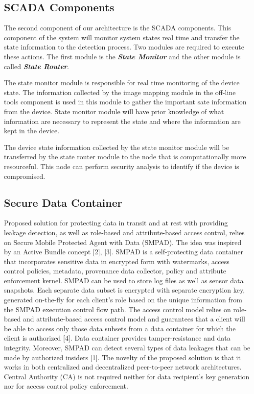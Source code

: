 \documentclass[conference]{IEEEtran}
\begin{document}
\subsection{SCADA Components}
The second component of our architecture is the SCADA components. This component of the system will monitor system states real time and transfer the state information to the detection process. Two modules are required to execute these actions. The first module is the \textit{\textbf{State Monitor}} and the other module is called \textit{\textbf{State Router}}.
\par The state monitor module is responsible for real time monitoring of the device state. The information collected by the image mapping module in the off-line tools component is used in this module to gather the important sate information from the device. State monitor module will have prior knowledge of what information are necessary to represent the state and where the information are kept in the device. 
\par The device state information collected by the state monitor module will be transferred by the state router module to the node that is computationally more resourceful. This node can perform security analysis to identify if the device is compromised.
\subsection{Secure Data Container}
Proposed solution for protecting data in transit and at rest with providing leakage detection, as well as role-based and attribute-based access control, relies on Secure Mobile Protected Agent with Data (SMPAD). The idea was inspired by an Active Bundle concept [2], [3]. SMPAD is a self-protecting data container that incorporates sensitive data in encrypted form with watermarks, access control policies, metadata, provenance data collector, policy and attribute enforcement kernel. SMPAD can be used to store log files as well as sensor data snapshots. Each separate data subset is encrypted with separate encryption key, generated on-the-fly for each client’s role based on the unique information from the SMPAD execution control flow path. The access control model relies on role-based and attribute-based access control model and guarantees that a client will be able to access only those data subsets from a data container for which the client is authorized [4]. Data container provides tamper-resistance and data integrity. Moreover, SMPAD can detect several types of data leakages that can be made by authorized insiders [1]. The novelty of the proposed solution is that it works in both centralized and decentralized peer-to-peer network architectures. Central Authority (CA) is not required neither for data recipient’s key generation nor for access control policy enforcement.
\end{document}
